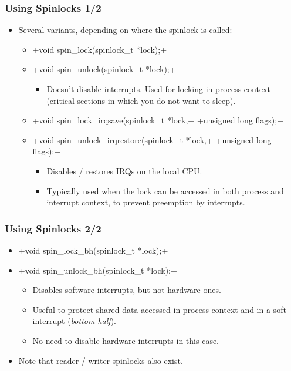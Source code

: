 \begin{frame}[fragile]
  \frametitle{Using Spinlocks 1/2}
  \begin{itemize}
  \item Several variants, depending on where the spinlock is called:
    \begin{itemize}
    \item {}+void spin_lock(spinlock_t *lock);+
    \item {}+void spin_unlock(spinlock_t *lock);+
      \begin{itemize}
      \item Doesn't disable interrupts. Used for locking in process
        context (critical sections in which you do not want to sleep).
      \end{itemize}
    \item {}+void spin_lock_irqsave(spinlock_t *lock,+
      +unsigned long flags);+
    \item {}+void spin_unlock_irqrestore(spinlock_t *lock,+
      +unsigned long flags);+
      \begin{itemize}
      \item Disables / restores IRQs on the local CPU.
      \item Typically used when the lock can be accessed in both process
        and interrupt context, to prevent preemption by interrupts.
      \end{itemize}
    \end{itemize}
  \end{itemize}
\end{frame}
\begin{frame}[fragile]
  \frametitle{Using Spinlocks 2/2}
  \begin{itemize}
  \item {}+void spin_lock_bh(spinlock_t *lock);+
  \item {}+void spin_unlock_bh(spinlock_t *lock);+
    \begin{itemize}
    \item Disables software interrupts, but not hardware ones.
    \item Useful to protect shared data accessed in process context
      and in a soft interrupt (\emph{bottom half}).
    \item No need to disable hardware interrupts in this case.
    \end{itemize}
  \item Note that reader / writer spinlocks also exist.
  \end{itemize}
\end{frame}

